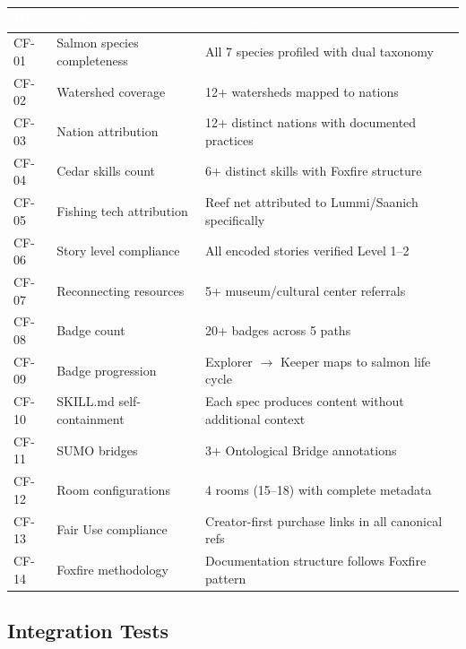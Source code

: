 \documentclass[11pt,letterpaper]{article}
\newcommand{\tableheader}[1]{\textbf{\sffamily\textcolor{white}{#1}}}
\begin{document}
\begin{center}
\begin{tabularx}{\textwidth}{C{1.2cm}L{3.5cm}X}
\toprule
{}
\tableheader{ID} & \tableheader{Verifies} & \tableheader{Expected} \\
\midrule
CF-01 & Salmon species completeness & All 7 species profiled with dual taxonomy \\
CF-02 & Watershed coverage & 12+ watersheds mapped to nations \\
CF-03 & Nation attribution & 12+ distinct nations with documented practices \\
CF-04 & Cedar skills count & 6+ distinct skills with Foxfire structure \\
CF-05 & Fishing tech attribution & Reef net attributed to Lummi/Saanich specifically \\
CF-06 & Story level compliance & All encoded stories verified Level 1--2 \\
CF-07 & Reconnecting resources & 5+ museum/cultural center referrals \\
CF-08 & Badge count & 20+ badges across 5 paths \\
CF-09 & Badge progression & Explorer $\rightarrow$ Keeper maps to salmon life cycle \\
CF-10 & SKILL.md self-containment & Each spec produces content without additional context \\
CF-11 & SUMO bridges & 3+ Ontological Bridge annotations \\
CF-12 & Room configurations & 4 rooms (15--18) with complete metadata \\
CF-13 & Fair Use compliance & Creator-first purchase links in all canonical refs \\
CF-14 & Foxfire methodology & Documentation structure follows Foxfire pattern \\
\bottomrule
\end{tabularx}
\end{center}

\subsection{Integration Tests}
\end{document}
